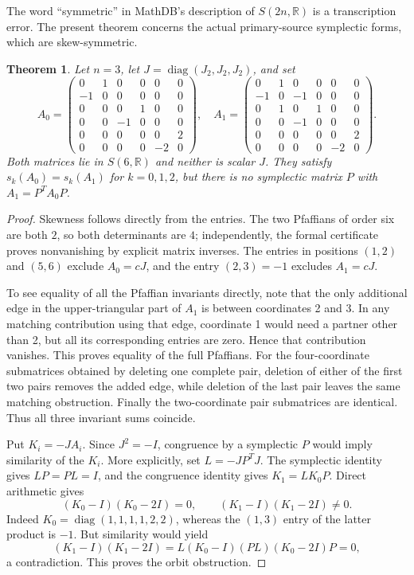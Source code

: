 \documentclass[11pt]{article}
\newtheorem{theorem}{Theorem}
\begin{document}
The word ``symmetric'' in MathDB's description of $S(2n,\mathbb R)$ is a transcription error. The present theorem concerns the actual primary-source symplectic forms, which are skew-symmetric.
\begin{theorem}
Let $n=3$, let $J=\operatorname{diag}(J_2,J_2,J_2)$, and set
\[
A_0=\begin{pmatrix}
0&1&0&0&0&0\\-1&0&0&0&0&0\\0&0&0&1&0&0\\
0&0&-1&0&0&0\\0&0&0&0&0&2\\0&0&0&0&-2&0
\end{pmatrix},\quad
A_1=\begin{pmatrix}
0&1&0&0&0&0\\-1&0&-1&0&0&0\\0&1&0&1&0&0\\
0&0&-1&0&0&0\\0&0&0&0&0&2\\0&0&0&0&-2&0
\end{pmatrix}.
\]
Both matrices lie in $S(6,\mathbb R)$ and neither is scalar $J$. They satisfy $s_k(A_0)=s_k(A_1)$ for $k=0,1,2$, but there is no symplectic matrix $P$ with $A_1=P^TA_0P$.
\end{theorem}
\begin{proof}
Skewness follows directly from the entries. The two Pfaffians of order six are both $2$, so both determinants are $4$; independently, the formal certificate proves nonvanishing by explicit matrix inverses. The entries in positions $(1,2)$ and $(5,6)$ exclude $A_0=cJ$, and the entry $(2,3)=-1$ excludes $A_1=cJ$.

To see equality of all the Pfaffian invariants directly, note that the only additional edge in the upper-triangular part of $A_1$ is between coordinates 2 and 3. In any matching contribution using that edge, coordinate 1 would need a partner other than 2, but all its corresponding entries are zero. Hence that contribution vanishes. This proves equality of the full Pfaffians. For the four-coordinate submatrices obtained by deleting one complete pair, deletion of either of the first two pairs removes the added edge, while deletion of the last pair leaves the same matching obstruction. Finally the two-coordinate pair submatrices are identical. Thus all three invariant sums coincide.

Put $K_i=-JA_i$. Since $J^2=-I$, congruence by a symplectic $P$ would imply similarity of the $K_i$. More explicitly, set $L=-JP^TJ$. The symplectic identity gives $LP=PL=I$, and the congruence identity gives $K_1=LK_0P$. Direct arithmetic gives
\[
 (K_0-I)(K_0-2I)=0,\qquad (K_1-I)(K_1-2I)\ne0.
\]
Indeed $K_0=\operatorname{diag}(1,1,1,1,2,2)$, whereas the $(1,3)$ entry of the latter product is $-1$. But similarity would yield
\[
 (K_1-I)(K_1-2I)
 =L(K_0-I)(PL)(K_0-2I)P=0,
\]
a contradiction. This proves the orbit obstruction.
\end{proof}
\end{document}
